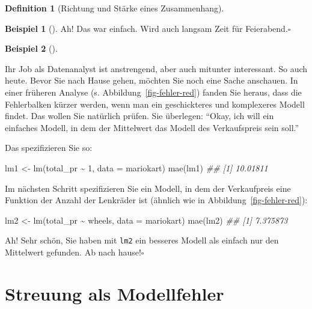 \documentclass[
  a4paper,
  DIV=11]{scrreprt}
\newenvironment{Shaded}{\begin{snugshade}}{\end{snugshade}}
\newcommand{\AttributeTok}[1]{\textcolor[rgb]{0.40,0.45,0.13}{#1}}
\newcommand{\DecValTok}[1]{\textcolor[rgb]{0.68,0.00,0.00}{#1}}
\newcommand{\DocumentationTok}[1]{\textcolor[rgb]{0.37,0.37,0.37}{\textit{#1}}}
\newcommand{\FunctionTok}[1]{\textcolor[rgb]{0.28,0.35,0.67}{#1}}
\newcommand{\NormalTok}[1]{\textcolor[rgb]{0.00,0.23,0.31}{#1}}
\newcommand{\OtherTok}[1]{\textcolor[rgb]{0.00,0.23,0.31}{#1}}
\newcommand{\SpecialCharTok}[1]{\textcolor[rgb]{0.37,0.37,0.37}{#1}}
\theoremstyle{definition}
\theoremstyle{definition}
\newtheorem{example}{Beispiel}[chapter]
\theoremstyle{definition}
\newtheorem{definition}{Definition}[chapter]
\theoremstyle{remark}
\begin{document}
\begin{definition}[Richtung und Stärke eines
Zusammenhang]
\begin{example}[]
Ah! Das war einfach. Wird auch langsam Zeit für Feierabend.\(\square\)

\end{example}

\begin{example}[]\protect\hypertarget{exm-gruppen-mw}{}\label{exm-gruppen-mw}

Ihr Job als Datenanalyst ist anstrengend, aber auch mitunter
interessant. So auch heute. Bevor Sie nach Hause gehen, möchten Sie noch
eine Sache anschauen. In einer früheren Analyse (s.
Abbildung~\ref{fig-fehler-red}) fanden Sie heraus, dass die Fehlerbalken
kürzer werden, wenn man ein geschickteres und komplexeres Modell findet.
Das wollen Sie natürlich prüfen. Sie überlegen: ``Okay, ich will ein
einfaches Modell, in dem der Mittelwert das Modell des Verkaufspreis
sein soll.''

Das spezifizieren Sie so:

\begin{Shaded}
\begin{Highlighting}[]
\NormalTok{lm1 }\OtherTok{\textless{}{-}} \FunctionTok{lm}\NormalTok{(total\_pr }\SpecialCharTok{\textasciitilde{}} \DecValTok{1}\NormalTok{, }\AttributeTok{data =}\NormalTok{ mariokart)}
\FunctionTok{mae}\NormalTok{(lm1)}
\DocumentationTok{\#\# [1] 10.01811}
\end{Highlighting}
\end{Shaded}

Im nächsten Schritt spezifizieren Sie ein Modell, in dem der
Verkaufpreis eine Funktion der Anzahl der Lenkräder ist (ähnlich wie in
Abbildung~\ref{fig-fehler-red}):

\begin{Shaded}
\begin{Highlighting}[]
\NormalTok{lm2 }\OtherTok{\textless{}{-}} \FunctionTok{lm}\NormalTok{(total\_pr }\SpecialCharTok{\textasciitilde{}}\NormalTok{ wheels, }\AttributeTok{data =}\NormalTok{ mariokart)}
\FunctionTok{mae}\NormalTok{(lm2)}
\DocumentationTok{\#\# [1] 7.375873}
\end{Highlighting}
\end{Shaded}

Ah! Sehr schön, Sie haben mit \texttt{lm2} ein besseres Modell als
einfach nur den Mittelwert gefunden. Ab nach hause!\(\square\)

\end{example}

\section{Streuung als Modellfehler}\label{streuung-als-modellfehler}


\end{definition}
\end{document}
